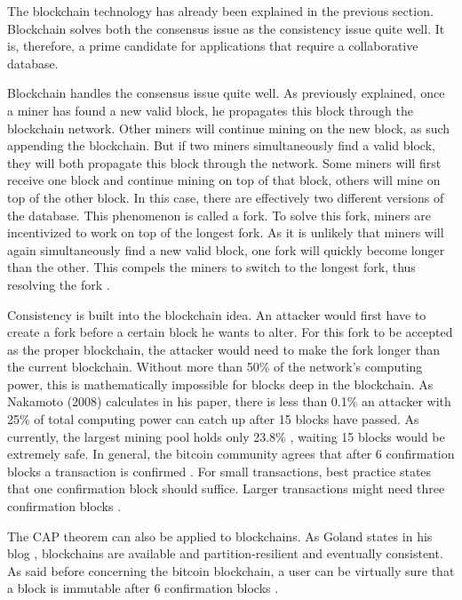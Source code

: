 The blockchain technology has already been explained in the previous section. Blockchain solves both the consensus issue as the consistency issue quite well. It is, therefore, a prime candidate for applications that require a collaborative database.

Blockchain handles the consensus issue quite well. As previously explained, once a miner has found a new valid block, he propagates this block through the blockchain network. Other miners will continue mining on the new block, as such appending the blockchain. But if two miners simultaneously find a valid block, they will both propagate this block through the network. Some miners will first receive one block and continue mining on top of that block, others will mine on top of the other block. In this case, there are effectively two different versions of the database. This phenomenon is called a fork. To solve this fork, miners are incentivized to work on top of the longest fork. As it is unlikely that miners will again simultaneously find a new valid block, one fork will quickly become longer than the other. This compels the miners to switch to the longest fork, thus resolving the fork \cite{antonopoulos:2014}. 


Consistency is built into the blockchain idea. An attacker would first have to create a fork before a certain block he wants to alter. For this fork to be accepted as the proper blockchain, the attacker would need to make the fork longer than the current blockchain. Without more than 50\% of the network's computing power, this is mathematically impossible for blocks deep in the blockchain. As Nakamoto (2008) calculates in his paper, there is less than 0.1\% an attacker with 25\% of total computing power can catch up after 15 blocks have passed. As currently, the largest mining pool holds only 23.8\% \cite{hashrate-distribution}, waiting 15 blocks would be extremely safe. In general, the bitcoin community agrees that after 6 confirmation blocks a transaction is confirmed \cite{bitcoin-confirmation-amount}. For small transactions, best practice states that one confirmation block should suffice. Larger transactions might need three confirmation blocks \cite{confirmation-safety}.


The CAP theorem can also be applied to blockchains. As Goland states in his blog \cite{blockchain-cap}, blockchains are available and partition-resilient and eventually consistent. As said before concerning the bitcoin blockchain, a user can be virtually sure that a block is immutable after 6 confirmation blocks \cite{bitcoin-confirmation-amount}.

